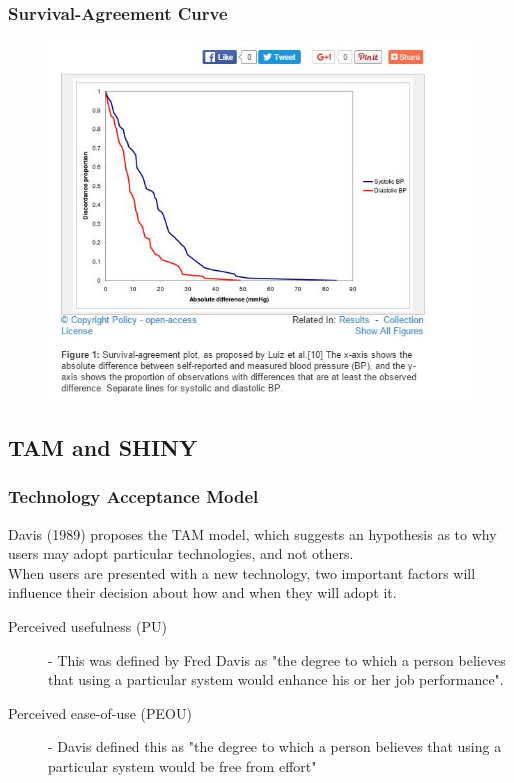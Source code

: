 \documentclass[compress]{beamer}        %
\begin{document}
		\begin{frame}
			\frametitle{Survival-Agreement Curve}
\begin{figure}
\centering
\includegraphics[width=0.7\linewidth]{images/SurvivalAgreementPlot}
\caption{}
\label{fig:SurvivalAgreementPlot}
\end{figure}
			
		\end{frame}
		\subsection{TAM and SHINY}
		\begin{frame}
			\frametitle{Technology Acceptance Model}
			\vspace{-0.4cm}
			Davis (1989) proposes the TAM model, which suggests an hypothesis as to why users may adopt particular technologies, and not others. \\ \bigskip
			When users are presented with a new 
			technology, two important factors will influence their decision about how and when they will adopt it.
			\begin{description}
				\item[Perceived usefulness (PU)] - This was defined by Fred Davis as "the degree to which a person believes that using a particular system would enhance his or her job performance".
				\item[Perceived ease-of-use (PEOU)] - Davis defined this as "the degree to which a person believes that using a particular system would be free from effort" 
			\end{description}
		\end{frame}
		
\end{document}
